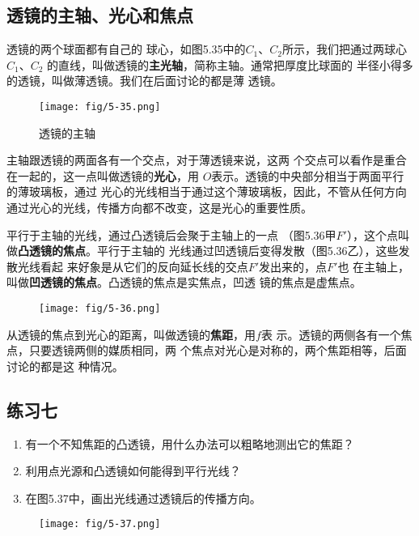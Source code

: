 \subsection{透镜的主轴、光心和焦点}

透镜的两个球面都有自己的
球心，如图5.35中的$C_1$、$C_2$所示，我们把通过两球心$C_1$、$C_2$
的直线，叫做透镜的\textbf{主光轴}，简称主轴。通常把厚度比球面的
半径小得多的透镜，叫做薄透镜。我们在后面讨论的都是薄
透镜。
\begin{figure}[htp]\centering
    \texttt{[image: fig/5-35.png]}
    \caption{透镜的主轴}
    \end{figure}

主轴跟透镜的两面各有一个交点，对于薄透镜来说，这两
个交点可以看作是重合在一起的，这一点叫做透镜的\textbf{光心}，用
$O$表示。透镜的中央部分相当于两面平行的薄玻璃板，通过
光心的光线相当于通过这个薄玻璃板，因此，不管从任何方向
通过光心的光线，传播方向都不改变，这是光心的重要性质。

平行于主轴的光线，通过凸透镜后会聚于主轴上的一点
（图5.36甲$F'$），这个点叫做\textbf{凸透镜的焦点}。平行于主轴的
光线通过凹透镜后变得发散（图5.36乙），这些发散光线看起
来好象是从它们的反向延长线的交点$F'$发出来的，点$F'$也
在主轴上，叫做\textbf{凹透镜的焦点}。凸透镜的焦点是实焦点，凹透
镜的焦点是虚焦点。
\begin{figure}[htp]\centering
    \texttt{[image: fig/5-36.png]}
    \caption{}
    \end{figure}

从透镜的焦点到光心的距离，叫做透镜的\textbf{焦距}，用$f$表
示。透镜的两侧各有一个焦点，只要透镜两侧的媒质相同，两
个焦点对光心是对称的，两个焦距相等，后面讨论的都是这
种情况。

\subsection*{练习七}
\begin{enumerate}
    \item 有一个不知焦距的凸透镜，用什么办法可以粗略地测出它的焦距？
    \item 利用点光源和凸透镜如何能得到平行光线？
    \item 在图5.37中，画出光线通过透镜后的传播方向。
\end{enumerate}

\begin{figure}[htp]\centering
    \texttt{[image: fig/5-37.png]}
    \caption{}
    \end{figure}

